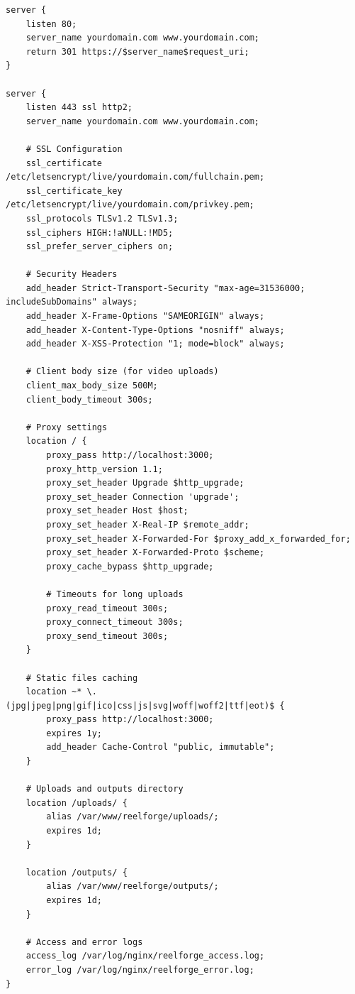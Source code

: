 \begin{lstlisting}[caption=/etc/nginx/sites-available/reelforge]
server {
    listen 80;
    server_name yourdomain.com www.yourdomain.com;
    return 301 https://$server_name$request_uri;
}

server {
    listen 443 ssl http2;
    server_name yourdomain.com www.yourdomain.com;

    # SSL Configuration
    ssl_certificate /etc/letsencrypt/live/yourdomain.com/fullchain.pem;
    ssl_certificate_key /etc/letsencrypt/live/yourdomain.com/privkey.pem;
    ssl_protocols TLSv1.2 TLSv1.3;
    ssl_ciphers HIGH:!aNULL:!MD5;
    ssl_prefer_server_ciphers on;

    # Security Headers
    add_header Strict-Transport-Security "max-age=31536000; includeSubDomains" always;
    add_header X-Frame-Options "SAMEORIGIN" always;
    add_header X-Content-Type-Options "nosniff" always;
    add_header X-XSS-Protection "1; mode=block" always;

    # Client body size (for video uploads)
    client_max_body_size 500M;
    client_body_timeout 300s;

    # Proxy settings
    location / {
        proxy_pass http://localhost:3000;
        proxy_http_version 1.1;
        proxy_set_header Upgrade $http_upgrade;
        proxy_set_header Connection 'upgrade';
        proxy_set_header Host $host;
        proxy_set_header X-Real-IP $remote_addr;
        proxy_set_header X-Forwarded-For $proxy_add_x_forwarded_for;
        proxy_set_header X-Forwarded-Proto $scheme;
        proxy_cache_bypass $http_upgrade;
        
        # Timeouts for long uploads
        proxy_read_timeout 300s;
        proxy_connect_timeout 300s;
        proxy_send_timeout 300s;
    }

    # Static files caching
    location ~* \.(jpg|jpeg|png|gif|ico|css|js|svg|woff|woff2|ttf|eot)$ {
        proxy_pass http://localhost:3000;
        expires 1y;
        add_header Cache-Control "public, immutable";
    }

    # Uploads and outputs directory
    location /uploads/ {
        alias /var/www/reelforge/uploads/;
        expires 1d;
    }

    location /outputs/ {
        alias /var/www/reelforge/outputs/;
        expires 1d;
    }

    # Access and error logs
    access_log /var/log/nginx/reelforge_access.log;
    error_log /var/log/nginx/reelforge_error.log;
}
\end{lstlisting}

